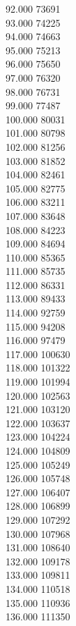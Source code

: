 { 92.000	73691 \\
 93.000	74225 \\
 94.000	74663 \\
 95.000	75213 \\
 96.000	75650 \\
 97.000	76320 \\
 98.000	76731 \\
 99.000	77487 \\
 100.000	80031 \\
 101.000	80798 \\
 102.000	81256 \\
 103.000	81852 \\
 104.000	82461 \\
 105.000	82775 \\
 106.000	83211 \\
 107.000	83648 \\
 108.000	84223 \\
 109.000	84694 \\
 110.000	85365 \\
 111.000	85735 \\
 112.000	86331 \\
 113.000	89433 \\
 114.000	92759 \\
 115.000	94208 \\
 116.000	97479 \\
 117.000	100630 \\
 118.000	101322 \\
 119.000	101994 \\
 120.000	102563 \\
 121.000	103120 \\
 122.000	103637 \\
 123.000	104224 \\
 124.000	104809 \\
 125.000	105249 \\
 126.000	105748 \\
 127.000	106407 \\
 128.000	106899 \\
 129.000	107292 \\
 130.000	107968 \\
 131.000	108640 \\
 132.000	109178 \\
 133.000	109811 \\
 134.000	110518 \\
 135.000	110936 \\
 136.000	111350 \\
}

